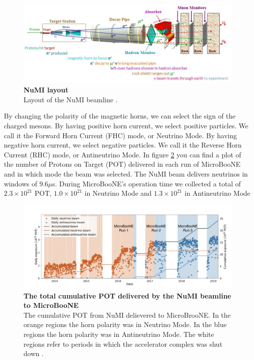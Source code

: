 %
\begin{figure}[h!]
    \centering
    \includegraphics[width=140mm]{Figures/numi.jpg}
    \caption[NuMI layout]{{\textbf{NuMI layout}} \\Layout of the NuMI beamline \cite{numi}.}
    \label{fig:numi}
\end{figure}
%
By changing the polarity of the magnetic horns, we can select the sign of the charged mesons. By having positive horn current, we select positive particles. We call it the Forward Horn Current (FHC) mode, or Neutrino Mode. By having negative horn current, we select negative particles. We call it the Reverse Horn Current (RHC) mode, or Antineutrino Mode. In figure \ref{beam_mode_uboone} you can find a plot of the number of Protons on Target (POT) delivered in each run of MicroBooNE and in which mode the beam was selected. The NuMI beam delivers neutrinos in windows of $9.6 \mu$s. During MicroBooNE's operation time we collected a total of $2.3\times 10^{21}$ POT, $1.0\times10^{21}$ in Neutrino Mode and $1.3\times10^{21}$ in Antineutrino Mode
%
\begin{figure}[h!]
    \centering
    \includegraphics[width=150mm]{Figures/beam_mode_uboone.png}
    \caption[The total cumulative POT delivered by the NuMI beamline to MicroBooNE]{{\textbf{The total cumulative POT delivered by the NuMI beamline to MicroBooNE}}\\The cumulative POT from NuMI delievered to MicroBrooNE. In the orange regions the horn polarity was in Neutrino Mode. In the blue regions the horn polarity was in Antineutrino Mode. The white regions refer to periods in which the accelerator complex was shut down \cite{krish_phd}.}
    \label{beam_mode_uboone}
\end{figure}
%
